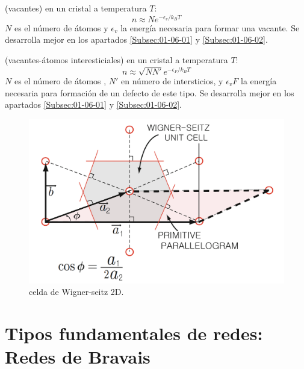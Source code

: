 \begin{definition}
    (vacantes) en un cristal a temperatura $T$:
    \begin{equation}
    n \approx N e^{-\epsilon_v /k_B T}
    \end{equation}
    $N$ es el número de átomos y $\epsilon_v$ la energía necesaria para formar una vacante. Se desarrolla mejor en los apartados \ref{Subsec:01-06-01} y \ref{Subsec:01-06-02}.
\end{definition}


\begin{definition}
    (vacantes-átomos interesticiales) en un cristal a temperatura $T$:
    \begin{equation}
    n \approx \sqrt{NN'} e^{-\epsilon_F /k_B T}
    \end{equation}
    $N$ es el número de átomos , $N'$ en número de intersticios, y $\epsilon_vF$ la energía necesaria para formación de un defecto de este tipo. Se desarrolla mejor en los apartados \ref{Subsec:01-06-01} y \ref{Subsec:01-06-02}.
\end{definition}
    

\begin{figure}[h!] \centering
    \includegraphics[scale=0.3]{Cuerpo/Ch_01/Wigner-seitz_1.png}
    \caption{celda de Wigner-seitz 2D.}
    \label{Fig:01-02}
\end{figure}



 \section{Tipos fundamentales de redes: Redes de Bravais}


